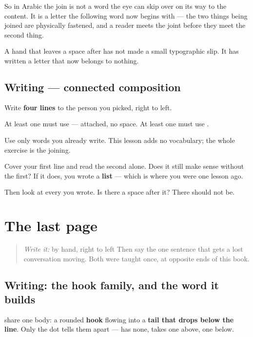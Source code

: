So in Arabic the join is not a word the eye can skip over on its way to the content. It is a letter the following word now begins with — the two things being joined are physically fastened, and a reader meets the joint before they meet the second thing.

A hand that leaves a space after \textbf{} has not made a small typographic slip. It has written a letter that now belongs to nothing.

\subsection*{Writing — connected composition}
Write \textbf{four lines} to the person you picked, right to left.

At least one must use \textbf{} — attached, no space. At least one must use \textbf{}.

Use only words you already write. This lesson adds no vocabulary; the whole exercise is the joining.

\begin{tcolorbox}[breakable,colback=teal!4,colframe=teal!35!black,title={Before you move on}]
Cover your first line and read the second alone. Does it still make sense without the first? If it does, you wrote a \textbf{list} — which is where you were one lesson ago.

Then look at every \textbf{} you wrote. Is there a space after it? There should not be.
\end{tcolorbox}
\section[\texorpdfstring{\ar{خير} · \ar{ء} · \ar{كرّر} \ar{من} … (khayr · hamza …)}{خير · ء · كرّر من … (khayr · hamza …)}]{The last page}

\label{lesson:AR-R45-the-last-page}



\begin{quote}
\emph{Write it:} \textbf{} by hand, right to left Then say the one sentence that gets a lost conversation moving. Both were taught once, at opposite ends of this book.
\end{quote}

\subsection*{Writing: the hook family, and the word it builds}
\textbf{   } share one body: a rounded \textbf{hook} flowing into a \textbf{tail that drops below the line}. Only the dot tells them apart — \textbf{} has none, \textbf{} takes one above, \textbf{} one below.

